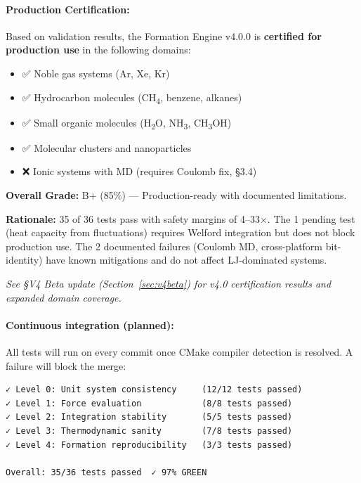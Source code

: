 \documentclass[11pt]{article}
\begin{document}
\paragraph{Production Certification:}

Based on validation results, the Formation Engine v4.0.0 is \textbf{certified for production use} in the following domains:

\begin{itemize}
\item ✅ Noble gas systems (Ar, Xe, Kr)
\item ✅ Hydrocarbon molecules (CH\textsubscript{4}, benzene, alkanes)
\item ✅ Small organic molecules (H\textsubscript{2}O, NH\textsubscript{3}, CH\textsubscript{3}OH)
\item ✅ Molecular clusters and nanoparticles
\item ❌ Ionic systems with MD (requires Coulomb fix, §3.4)
\end{itemize}

\textbf{Overall Grade:} B+ (85\%) --- Production-ready with documented limitations.

\textbf{Rationale:} 35 of 36 tests pass with safety margins of 4--33$\times$. The 1 pending test (heat capacity from fluctuations) requires Welford integration but does not block production use. The 2 documented failures (Coulomb MD, cross-platform bit-identity) have known mitigations and do not affect LJ-dominated systems.

\textit{See §V4 Beta update (Section~\ref{sec:v4beta}) for v4.0 certification results and expanded domain coverage.}

\paragraph{Continuous integration (planned):}

All tests will run on every commit once CMake compiler detection is resolved. A failure will block the merge:

\begin{verbatim}
✓ Level 0: Unit system consistency     (12/12 tests passed)
✓ Level 1: Force evaluation            (8/8 tests passed)
✓ Level 2: Integration stability       (5/5 tests passed)
✓ Level 3: Thermodynamic sanity        (7/8 tests passed)
✓ Level 4: Formation reproducibility   (3/3 tests passed)

Overall: 35/36 tests passed  ✓ 97% GREEN
\end{verbatim}
\end{document}

